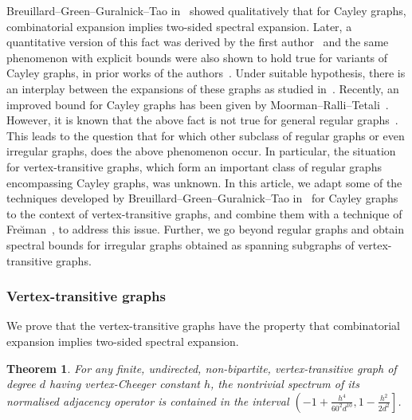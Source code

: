 \documentclass[10pt]{article}
\newtheorem{theorem}{Theorem}[section]
\theoremstyle{definition}
\begin{document}
Breuillard--Green--Guralnick--Tao in~\cite[Appendix E]{BGGTExpansionSimpleLie} showed qualitatively that for Cayley graphs, combinatorial expansion implies two-sided spectral expansion. Later, a quantitative version of this fact was derived by the first author~\cite{BiswasCheegerCayley} and the same phenomenon with explicit bounds were also shown to hold true for variants of Cayley graphs, in prior works of the authors~\cite{CheegerCayleySum, CheegerTwisted}. Under suitable hypothesis, there is an interplay between the expansions of these graphs as studied in~\cite{Expansion}. Recently, an improved bound for Cayley graphs has been given by Moorman--Ralli--Tetali~\cite{CayleyBottomBipartite}. However, it is known that the above fact is not true for general regular graphs~\cite[Example 2.1]{CayleyBottomBipartite}. This leads to the question that for which other subclass of regular graphs or even irregular graphs, does the above phenomenon occur. In particular, the situation for vertex-transitive graphs, which form an important class of regular graphs encompassing Cayley graphs, was unknown. In this article, we adapt some of the techniques developed by Breuillard--Green--Guralnick--Tao in~\cite[Appendix E]{BGGTExpansionSimpleLie} for Cayley graphs to the context of vertex-transitive graphs, and combine them with a technique of Fre\u{\i}man~\cite{FreimanGroupsInverseProb}, to address this issue. Further, we go beyond regular graphs and obtain spectral bounds for irregular graphs obtained as spanning subgraphs of vertex-transitive graphs.

\subsubsection{Vertex-transitive graphs}
We prove that the vertex-transitive graphs have the property that combinatorial expansion implies two-sided spectral expansion. 

\begin{theorem}
\label{Thm:Intro}
For any finite, undirected, non-bipartite, vertex-transitive graph of degree $d$ having vertex-Cheeger constant $h$, the nontrivial spectrum of its normalised adjacency operator is contained in the interval $\left(-1 + \frac{h^4}{60^2 d^{10}}, 1- \frac{h^2}{2d^2}\right]$. 
\end{theorem}
\end{document}
